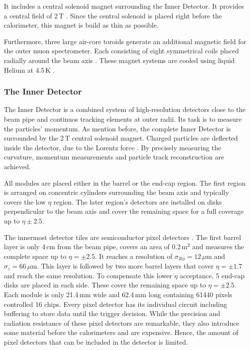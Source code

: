 \documentclass[bachelor,ngerman,english]{GAUBM}
\begin{document}
It includes a central solenoid magnet surrounding the Inner Detector. It provides a central field of 2\,T \cite{atlas:tech_design_report_01}. Since the central solenoid is placed right before the calorimeter, this magnet is build as thin as possible. 

Furthermore, three large air-core toroids generate an additional magnetic field for the outer muon spectrometer. Each consisting of eight symmetrical coils placed radially around the beam axis \cite{atlas:tech_design_report_01}. These magnet systems are cooled using liquid Helium at 4.5\,K \cite{atlas:tech_design_report_01}. 

\subsubsection*{The Inner Detector}
The Inner Detector \cite{atlas:tech_design_report_inner_01,atlas:tech_design_report_inner_02} is a combined system of high-resolution detectors close to the beam pipe and continuos tracking elements at outer radii. Its task is to measure the particles' momentum. As mention before, the complete Inner Detector is surrounded by the 2\,T central solenoid magnet. Charged particles are deflected inside the detector, due to the Lorentz force \cite{theory:general_particles_nuclei}. By precisely measuring the curvature, momentum measurements and particle track reconstruction are achieved.

All modules are placed either in the barrel or the end-cap region. The first region is arranged on concentric cylinders surrounding the beam axis and typically covers the low $\eta$ region. The later region's detectors are installed on disks perpendicular to the beam axis and cover the remaining space for a full coverage up to $\eta\pm2.5$.

The innermost detector tiles are semiconductor pixel detectors \cite{atlas:tech_design_report_01,atlas:pixel_detector}. The first barrel layer is only 4\,cm from the beam pipe, covers an area of 0.2\,m$^2$ and measures the complete space up to $\eta=\pm2.5$. It reaches a resolution of $\sigma_{R\phi}=12\,\mu\text{m}$ and $\sigma_{z}=66\,\mu\text{m}$. This layer is followed by two more barrel layers that cover $\eta=\pm1.7$ and reach the same resolution. To compensate this lower $\eta$ acceptance, 5 end-cap disks are placed in each side. These cover the remaining space up to $\eta=\pm2.5$. Each module is only 21.4\,mm wide and 62.4\,mm long containing 61440 pixels controlled 16 chips. Every pixel detector has its individual circuit including buffering to store data until the trigger decision. While the precision and radiation resistance of these pixel detectors are remarkable, they also introduce some material before the calorimeters and are expensive. Hence, the amount of pixel detectors that can be included in the detector is limited. 
\end{document}
